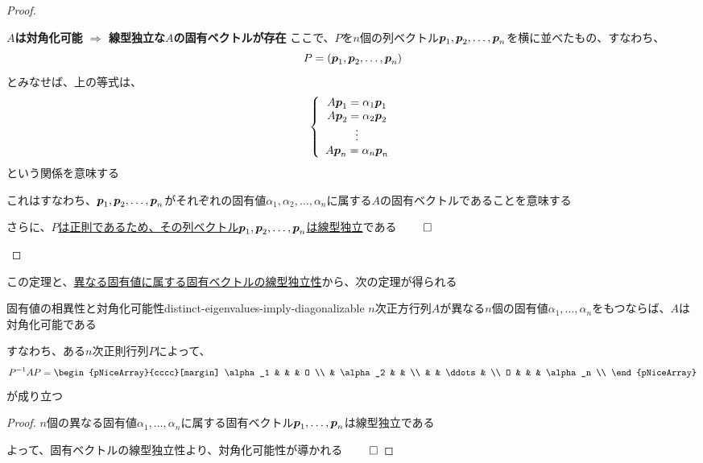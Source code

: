 \documentclass[../../../topic_linear-algebra]{subfiles}
\begin{document}
\begin{proof}
\begin{subpattern}{\bfseries $A$は対角化可能 $\Longrightarrow$ 線型独立な$A$の固有ベクトルが存在}
    ここで、$P$を$n$個の列ベクトル$\vb*{p}_1, \vb*{p}_2, \ldots, \vb*{p}_n$を横に並べたもの、すなわち、
    \begin{equation*}
      P = (\vb*{p}_1, \vb*{p}_2, \ldots, \vb*{p}_n)
    \end{equation*}
    とみなせば、上の等式は、
    \begin{equation*}
      \left\{
      \begin{array}{c}
        A\vb*{p}_1 = \alpha_1 \vb*{p}_1 \\
        A\vb*{p}_2 = \alpha_2 \vb*{p}_2 \\
        \vdots                          \\
        A\vb*{p}_n = \alpha_n \vb*{p}_n
      \end{array}
      \right.
    \end{equation*}
    という関係を意味する

    これはすなわち、$\vb*{p}_1, \vb*{p}_2, \ldots, \vb*{p}_n$がそれぞれの固有値$\alpha_1, \alpha_2, \ldots, \alpha_n$に属する$A$の固有ベクトルであることを意味する

    さらに、\hyperref[thm:invertible-iff-col-indep]{$P$は正則であるため、その列ベクトル$\vb*{p}_1, \vb*{p}_2, \ldots, \vb*{p}_n$は線型独立}である $\qed$
  \end{subpattern}
\end{proof}

この定理と、\hyperref[thm:eigenvectors-of-distinct-eigenvalues-are-independent]{異なる固有値に属する固有ベクトルの線型独立性}から、次の定理が得られる

\begin{theorem}{固有値の相異性と対角化可能性}{distinct-eigenvalues-imply-diagonalizable}
  $n$次正方行列$A$が異なる$n$個の固有値$\alpha_1, \ldots, \alpha_n$をもつならば、$A$は対角化可能である

  すなわち、ある$n$次正則行列$P$によって、
  \begin{equation*}
    P^{-1}AP = \begin{pNiceArray}{cccc}[margin]
      \alpha_1 & & & O \\
      & \alpha_2 & & \\
      & & \ddots & \\
      O & & & \alpha_n \\
    \end{pNiceArray}
  \end{equation*}
  が成り立つ
\end{theorem}

\begin{proof}
  $n$個の異なる固有値$\alpha_1, \ldots, \alpha_n$に属する固有ベクトル$\vb*{p}_1, \ldots, \vb*{p}_n$は線型独立である

  よって、固有ベクトルの線型独立性より、対角化可能性が導かれる $\qed$
\end{proof}
\end{document}
